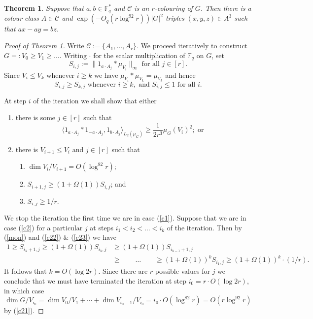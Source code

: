 \documentclass[10pt,a4paper]{amsart}
\newtheorem{theorem}{Theorem}
\providecommand{\F}{\mathbb{F}}
\begin{document}
\begin{theorem}\label{thm.model}
Suppose that $a,b \in \F_q^*$ and $\mathcal{C}$ is an $r$-colouring of $G$. Then there is a colour class $A \in \mathcal{C}$ and $\exp(-O_q(r\log^92r)) |G|^2$ triples $(x,y,z) \in A^3$ such that $ax-ay = bz$.
\end{theorem}

\begin{proof}[Proof of Theorem \ref{thm.model}]
Write $\mathcal{C}:=\{A_1,\dots,A_r\}$. We proceed iteratively to construct $G=:V_0 \geq V_1\geq \dots$. Writing $\cdot$ for the scalar multiplication of $\F_q$ on $G$, set
\begin{equation*}
S_{i,j}:=\|1_{a\cdot A_j}\ast \mu_{V_i}\|_\infty \text{ for all } j \in [r].
\end{equation*}
Since $V_i \leq V_{k}$ whenever $i \geq k$ we have $\mu_{V_i} \ast \mu_{V_k} = \mu_{V_k}$ and hence
\begin{equation}\label{mon}
S_{i,j} \geq S_{k,j}\text{ whenever }i \geq k, \text{ and } S_{i,j} \leq 1 \text{ for all }i.
\end{equation}

At step $i$ of the iteration we shall show that either
\begin{enumerate}
\item\label{c1} there is some $j \in [r]$ such that
\begin{equation*}
\langle 1_{a\cdot A_j} \ast 1_{-a\cdot A_j},1_{b \cdot A_j}\rangle_{L_2(\mu_G)} \geq \frac{1}{2r^3}\mu_G(V_i)^2;\text{ or }
\end{equation*}
\item\label{c2} there is $V_{i+1} \leq V_i$ and $j \in [r]$ such that
\begin{enumerate}
\item\label{c21} $\dim V_i/V_{i+1} =O(\log^82r)$;
\item\label{c22} $S_{i+1,j} \geq (1+\Omega(1))S_{i,j}$; and
\item\label{c23} $S_{i,j} \geq 1/r$.
\end{enumerate}
\end{enumerate}
We stop the iteration the first time we are in case (\ref{c1}). Suppose that we are in case (\ref{c2}) for a particular $j$ at steps $i_1 <i_2<\dots < i_k$ of the iteration. Then by (\ref{mon}) and (\ref{c22}) \& (\ref{c23}) we have
\begin{align*}
1 \geq S_{i_k+1,j} \geq (1+\Omega(1))S_{i_k,j} & \geq (1+\Omega(1))S_{i_{k-1}+1,j}\\ & \geq \qquad \dots \qquad  \geq (1+\Omega(1))^kS_{i_1,j} \geq (1+\Omega(1))^k\cdot (1/r).
\end{align*}
It follows that $k=O(\log 2r)$. Since there are $r$ possible values for $j$ we conclude that we must have terminated the iteration at step $i_0=r\cdot O(\log 2r)$, in which case
\begin{equation*}
\dim G/V_{i_0} =\dim V_0/V_1 + \cdots + \dim V_{i_0-1}/V_{i_0} =i_0\cdot O(\log^82r) = O(r\log^92r)
\end{equation*} by (\ref{c21}).


\end{proof}
\end{document}
